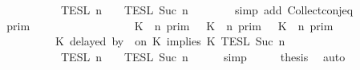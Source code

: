 \begin{isabellebody}
\ \ \ \ \ \ \ \ \ \ \ \ \ \ \ \ {\isasyminter}\ {\isasymlbrakk}{\isasymlbrakk}\ {\isasymPsi}\ {\isasymrbrakk}{\isasymrbrakk}\isactrlsub T\isactrlsub E\isactrlsub S\isactrlsub L\isactrlbsup {\isasymge}\ n\isactrlesup \ {\isasyminter}\ {\isasymlbrakk}{\isasymlbrakk}\ {\isasymPhi}\ {\isasymrbrakk}{\isasymrbrakk}\isactrlsub T\isactrlsub E\isactrlsub S\isactrlsub L\isactrlbsup {\isasymge}\ Suc\ n\isactrlesup {\isacartoucheclose}\isanewline
\ \ \ \ \ \ \isamarkupfalse%
\ {\isacharparenleft}simp\ add{\isacharcolon}\ Collect{\isacharunderscore}conj{\isacharunderscore}eq{\isacharparenright}\isanewline
\ \ \isamarkupfalse%
\ \isamarkupfalse%
\ {\isacartoucheopen}{\isachardot}{\isachardot}{\isachardot}\ {\isacharequal}\ {\isasymlbrakk}{\isasymlbrakk}\ {\isasymGamma}\ {\isasymrbrakk}{\isasymrbrakk}\isactrlsub p\isactrlsub r\isactrlsub i\isactrlsub m\isanewline
\ \ \ \ \ \ \ \ \ \ \ \ \ \ \ \ {\isasyminter}\ {\isacharparenleft}{\isasymlbrakk}\ K\ {\isasymnot}{\isasymUp}\ n\ {\isasymrbrakk}\isactrlsub p\isactrlsub r\isactrlsub i\isactrlsub m\ {\isasymunion}\ {\isacharparenleft}{\isasymlbrakk}\ K\ {\isasymUp}\ n\ {\isasymrbrakk}\isactrlsub p\isactrlsub r\isactrlsub i\isactrlsub m\ {\isasyminter}\ {\isasymlbrakk}\ K\ {\isasymUp}\ n\ {\isasymrbrakk}\isactrlsub p\isactrlsub r\isactrlsub i\isactrlsub m{\isacharparenright}{\isacharparenright}\isanewline
\ \ \ \ \ \ \ \ \ \ \ \ \ \ \ \ {\isasyminter}\ {\isasymlbrakk}\ K\ delayed\ by\ {}\ on\ K\ implies\ K\ {\isasymrbrakk}\isactrlsub T\isactrlsub E\isactrlsub S\isactrlsub L\isactrlbsup {\isasymge}\ Suc\ n\isactrlesup \isanewline
\ \ \ \ \ \ \ \ \ \ \ \ \ \ \ \ {\isasyminter}\ {\isasymlbrakk}{\isasymlbrakk}\ {\isasymPsi}\ {\isasymrbrakk}{\isasymrbrakk}\isactrlsub T\isactrlsub E\isactrlsub S\isactrlsub L\isactrlbsup {\isasymge}\ n\isactrlesup \ {\isasyminter}\ {\isasymlbrakk}{\isasymlbrakk}\ {\isasymPhi}\ {\isasymrbrakk}{\isasymrbrakk}\isactrlsub T\isactrlsub E\isactrlsub S\isactrlsub L\isactrlbsup {\isasymge}\ Suc\ n\isactrlesup {\isacartoucheclose}\isanewline
\ \ \ \ \isamarkupfalse%
\ simp\isanewline
\ \ \isamarkupfalse%
\ \isamarkupfalse%
\ {\isacharquery}thesis\ \isamarkupfalse%
\ auto\isanewline
{}\isamarkupfalse%
%
\endisatagproof
{\isafoldproof}%
%
\isadelimproof
\isanewline
%
\endisadelimproof
\isanewline
{}\isamarkupfalse%

\end{isabellebody}

